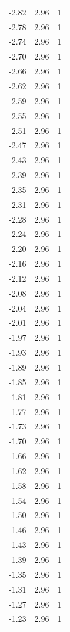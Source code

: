 \begin{longtable}{lrr}
  -2.82 & 2.96 & 1 \\
  -2.78 & 2.96 & 1 \\
  -2.74 & 2.96 & 1 \\
  -2.70 & 2.96 & 1 \\
  -2.66 & 2.96 & 1 \\
  -2.62 & 2.96 & 1 \\
  -2.59 & 2.96 & 1 \\
  -2.55 & 2.96 & 1 \\
  -2.51 & 2.96 & 1 \\
  -2.47 & 2.96 & 1 \\
  -2.43 & 2.96 & 1 \\
  -2.39 & 2.96 & 1 \\
  -2.35 & 2.96 & 1 \\
  -2.31 & 2.96 & 1 \\
  -2.28 & 2.96 & 1 \\
  -2.24 & 2.96 & 1 \\
  -2.20 & 2.96 & 1 \\
  -2.16 & 2.96 & 1 \\
  -2.12 & 2.96 & 1 \\
  -2.08 & 2.96 & 1 \\
  -2.04 & 2.96 & 1 \\
  -2.01 & 2.96 & 1 \\
  -1.97 & 2.96 & 1 \\
  -1.93 & 2.96 & 1 \\
  -1.89 & 2.96 & 1 \\
  -1.85 & 2.96 & 1 \\
  -1.81 & 2.96 & 1 \\
  -1.77 & 2.96 & 1 \\
  -1.73 & 2.96 & 1 \\
  -1.70 & 2.96 & 1 \\
  -1.66 & 2.96 & 1 \\
  -1.62 & 2.96 & 1 \\
  -1.58 & 2.96 & 1 \\
  -1.54 & 2.96 & 1 \\
  -1.50 & 2.96 & 1 \\
  -1.46 & 2.96 & 1 \\
  -1.43 & 2.96 & 1 \\
  -1.39 & 2.96 & 1 \\
  -1.35 & 2.96 & 1 \\
  -1.31 & 2.96 & 1 \\
  -1.27 & 2.96 & 1 \\
  -1.23 & 2.96 & 1 \\

\end{longtable}
